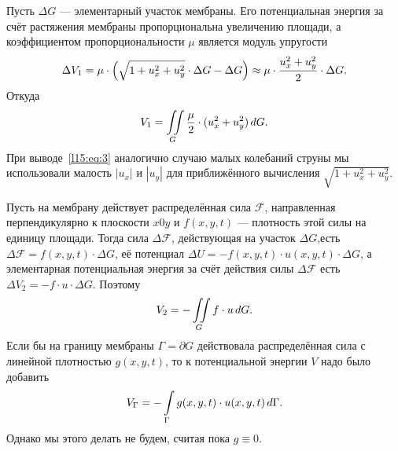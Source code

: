 \documentclass[12pt,a4paper,openany,fleqn]{book}
\newcommand{\mc}[1]{\ensuremath{\mathcal{#1}}}
\theoremstyle{definition}
\begin{document}
	Пусть $\Delta G$ --- элементарный участок мембраны. Его потенциальная энергия за счёт растяжения мембраны пропорциональна увеличению площади, а коэффициентом пропорциональности $\mu$ является модуль упругости
	\begin{equation*}
		\hfill\Delta V_1=\mu\cdot\left(\sqrt{1+u_x^2+u_y^2}\cdot\Delta G-\Delta G\right)\approx\mu\cdot\frac{u_x^2+u_y^2}{2}\cdot\Delta G.\hfill
	\end{equation*}
	Откуда
	\begin{equation}\label{l15:eq:3}
		\hfill V_1=\iint\limits_{G}\frac{\mu}{2}\cdot(u_x^2+u_y^2)\,dG.\hfill
	\end{equation}
	При выводе~\eqref{l15:eq:3} аналогично случаю малых колебаний струны мы использовали малость $|u_x|$ и $|u_y|$ для приближённого вычисления $\sqrt{1+u_x^2+u_y^2}$.
	
	Пусть на мембрану действует распределённая сила $\mc{F}$, направленная перпендикулярно к плоскости $x0y$ и $f(x,y,t)$ --- плотность этой силы на единицу площади. Тогда сила $\Delta\mc{F}$, действующая на участок $\Delta G$,есть $\Delta\mc{F}=f(x,y,t)\cdot\Delta G$, её потенциал $\Delta U=-f(x,y,t)\cdot u(x,y,t)\cdot\Delta G$, а элементарная потенциальная энергия за счёт действия силы $\Delta \mc{F}$ есть $\Delta V_{2}=-f\cdot u\cdot\Delta G$. Поэтому 
	\begin{equation}\label{l15:eq:4}
		\hfill V_{2}=-\iint\limits_{G}f\cdot u\,dG.\hfill
	\end{equation}
	Если бы на границу мембраны $\Gamma=\partial G$ действовала распределённая сила с линейной плотностью $g(x,y,t)$, то к потенциальной энергии $V$ надо было добавить
	\begin{equation}\label{l15:eq:5}
		\hfill V_{\Gamma}=-\int\limits_{\Gamma}g(x,y,t)\cdot u(x,y,t)\,d\Gamma.\hfill
	\end{equation}  
	Однако мы этого делать не будем, считая пока $g\equiv0$.
	
\end{document}
